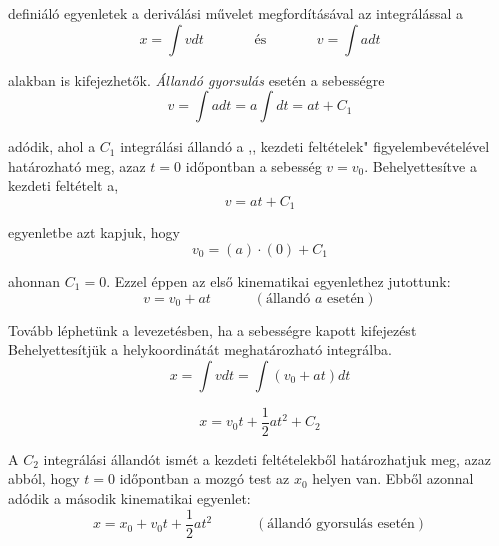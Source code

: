 \documentclass[../fizika.tex]{subfiles}
\begin{document}
                \noindent definiáló egyenletek a deriválási művelet megfordításával az integrálással a 
                    \begin{equation*}
                        x = \int vdt \;\;\;\;\;\;\;\;\;\;\;\;\; \text{és} \;\;\;\;\;\;\;\;\;\;\;\;\; v = \int adt
                    \end{equation*}

                \noindent alakban is kifejezhetők. \textit{Állandó gyorsulás} esetén a sebességre 
                    \begin{equation*}
                        v = \int adt = a \int dt = at + C_1
                    \end{equation*}

                \noindent adódik, ahol a $C_1$ integrálási állandó a ,, kezdeti feltételek" figyelembevételével határozható meg, azaz $t = 0$ időpontban a sebesség $v = v_0$. Behelyettesítve a kezdeti feltételt a, 
                    \begin{equation*}
                        v = at + C_1
                    \end{equation*}

                \noindent egyenletbe azt kapjuk, hogy 
                    \begin{equation*}
                        v_0 = (a)\cdot (0) + C_1
                    \end{equation*}

                \noindent ahonnan $C_1 = 0$. Ezzel éppen az első kinematikai egyenlethez jutottunk:
                    \begin{equation*}
                        \boxed{v = v_0 + at \;\;\;\;\;\;\;\;\;\;\; (\text{állandó }a\text{ esetén})}
                    \end{equation*}

                Tovább léphetünk a levezetésben, ha a sebességre kapott kifejezést Behelyettesítjük a helykoordinátát meghatározható integrálba.
                    \begin{equation*}
                        x = \int vdt = \int (v_0 + at)dt
                    \end{equation*}

                    \begin{equation*}
                        x = v_0t + \frac{1}{2}at^2 + C_2
                    \end{equation*} 

                A $C_2$ integrálási állandót ismét a kezdeti feltételekből határozhatjuk meg, azaz abból, hogy $t = 0$ időpontban a mozgó test az $x_0$ helyen van. Ebből azonnal adódik a második kinematikai egyenlet:
                    \begin{equation*}
                        \boxed{x = x_0 + v_0t + \frac{1}{2}at^2 \;\;\;\;\;\;\;\;\;\;\; (\text{állandó gyorsulás esetén})}
                    \end{equation*}
\end{document}
